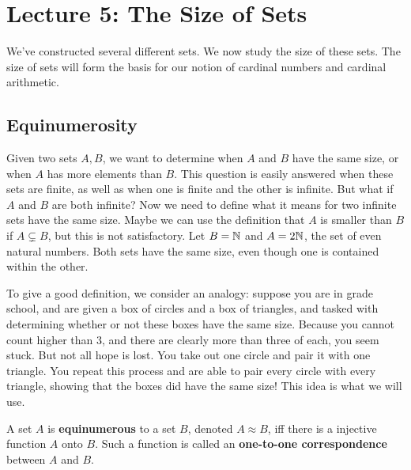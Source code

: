 \newcommand{\card}[1]{\operatorname{card}(#1)}

\chapter{Lecture 5: The Size of Sets}

We've constructed several different sets. We now study the size of these sets. The size of sets will form the basis for our notion of cardinal numbers and cardinal arithmetic. 

\section{Equinumerosity}

Given two sets $A,B$, we want to determine when $A$ and $B$ have the same size, or when $A$ has more elements than $B$. This question is easily answered when these sets are finite, as well as when one is finite and the other is infinite. But what if $A$ and $B$ are both infinite? Now we need to define what it means for two infinite sets have the same size. Maybe we can use the definition that $A$ is smaller than $B$ if $A \subsetneq B$, but this is not satisfactory. Let $B = \mathbb{N}$ and $A = 2\mathbb{N}$, the set of even natural numbers. Both sets have the same size, even though one is contained within the other.

To give a good definition, we consider an analogy: suppose you are in grade school, and are given a box of circles and a box of triangles, and tasked with determining whether or not these boxes have the same size. Because you cannot count higher than 3, and there are clearly more than three of each, you seem stuck. But not all hope is lost. You take out one circle and pair it with one triangle. You repeat this process and are able to pair every circle with every triangle, showing that the boxes did have the same size! This idea is what we will use.

\begin{definition}
    A set $A$ is \textbf{equinumerous} to a set $B$, denoted $A \approx B$, iff there is a injective function $A$ onto $B$. Such a function is called an \textbf{one-to-one correspondence} between $A$ and $B$.
\end{definition}

